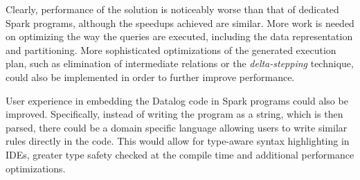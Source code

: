 Clearly, performance of the solution is noticeably worse than that of dedicated Spark programs, although the speedups achieved are similar. More work is needed on optimizing the way the queries are executed, including the data representation and partitioning. More sophisticated optimizations of the generated execution plan, such as elimination of intermediate relations or the \emph{delta-stepping} technique, could also be implemented in order to further improve performance.

User experience in embedding the Datalog code in Spark programs could also be improved. Specifically, instead of writing the program as a string, which is then parsed, there could be a domain specific language allowing users to write similar rules directly in the code. This would allow for type-aware syntax highlighting in IDEs, greater type safety checked at the compile time and additional performance optimizations.


